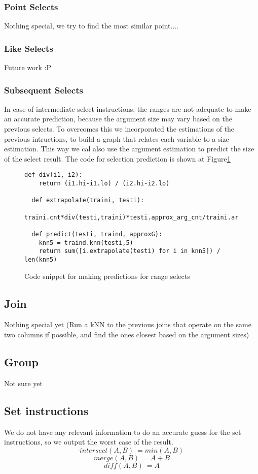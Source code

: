 \subsubsection{Point Selects}
Nothing special, we try to find the most similar point....

\subsubsection{Like Selects}
Future work :P

\subsubsection{Subsequent Selects}
In case of intermediate select instructions, the ranges are not adequate to
make an accurate prediction, because the argument size may vary based on the
previous selects. To overcomes this we incorporated the estimations of the
previous intructions, to build a graph that relates each variable to a size
estimation. This way we cal also use the argument estimation to predict the
size of the select result. The code for selection prediction is shown at
Figure\ref{sel:code}

\begin{figure}[t]
\begin{lstlisting}[frame=single]
  def div(i1, i2):
    return (i1.hi-i1.lo) / (i2.hi-i2.lo)

  def extrapolate(traini, testi):
      traini.cnt*div(testi,traini)*testi.approx_arg_cnt/traini.argcnt

  def predict(testi, traind, approxG):
    knn5 = traind.knn(testi,5)
    return sum([i.extrapolate(testi) for i in knn5]) / len(knn5)
\end{lstlisting}
  \caption{Code snippet for making predictions for range selects}
  \label{sel:code}
\end{figure}


\subsection{Join}
Nothing special yet
(Run a kNN to the previous joins that operate on the same two columns if possible,
and find the ones closest based on the argument sizes)
\subsection{Group}
Not sure yet

\subsection{Set instructions}
We do not have any relevant information to do an accurate guess for the
set instructions, so we output the worst case of the result.
$$ intersect(A,B) ~= min(A,B)$$
$$ merge(A,B) ~= A+B $$
$$ diff(A,B) ~= A $$

